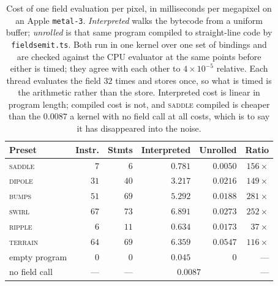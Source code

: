 \begin{table}[t]
  \centering
  \small
  \caption{Cost of one field evaluation per pixel, in milliseconds per megapixel
  on an Apple \texttt{metal-3}. \emph{Interpreted} walks the
  bytecode from a uniform buffer; \emph{unrolled} is that same program compiled to
  straight-line code by \texttt{fields\pslash emit.ts}. Both run in one kernel over
  one set of bindings and are checked against the CPU evaluator at the same points
  before either is timed; they agree with each other to
  $4{\times}10^{-5}$ relative. Each thread evaluates
  the field $32$ times and stores once, so what is timed is the
  arithmetic rather than the store. Interpreted cost is linear in program length;
  compiled cost is not, and \textsc{saddle} compiled is cheaper than the
  $0.0087$ a kernel with no field call at all costs, which is to say it has
  disappeared into the noise.}
  \label{tab:compile}
  \begin{tabular}{@{}lrrrrr@{}}
    \toprule
    Preset & Instr. & Stmts & Interpreted & Unrolled & Ratio \\
    \midrule
    \textsc{saddle} & $7$ & $6$ & $0.781$ & $\mathbf{0.0050}$ & $156\times$ \\
    \textsc{dipole} & $31$ & $40$ & $3.217$ & $\mathbf{0.0216}$ & $149\times$ \\
    \textsc{bumps} & $51$ & $69$ & $5.292$ & $\mathbf{0.0188}$ & $281\times$ \\
    \textsc{swirl} & $67$ & $73$ & $6.891$ & $\mathbf{0.0273}$ & $252\times$ \\
    \textsc{ripple} & $6$ & $11$ & $0.634$ & $\mathbf{0.0173}$ & $37\times$ \\
    \textsc{terrain} & $64$ & $69$ & $6.359$ & $\mathbf{0.0547}$ & $116\times$ \\
    \midrule
    empty program & $0$ & $0$ & $0.045$ & $0$ & --- \\
    no field call & --- & --- & \multicolumn{2}{c}{$0.0087$} & --- \\
    \bottomrule
  \end{tabular}
\end{table}
